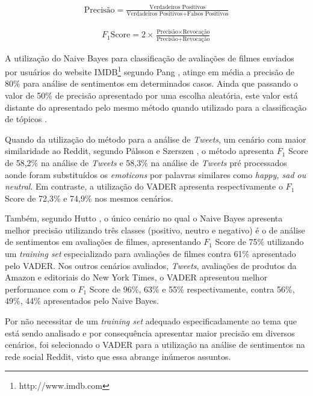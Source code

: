 \begin{equation}
\begin{gathered}
\text{Precisão}
=
\frac{\text{Verdadeiros Positivos}}{\text{Verdadeiros Positivos} +
\text{Falsos Positivos}}
\label{eq:precision}
\end{gathered}
\end{equation}

\begin{equation}
\begin{gathered}
F_1 \text{Score}
= 2 \times
\frac{\text{Precisão} \times \text{Revocação}}{\text{Precisão} +
\text{Revocação}}
\label{eq:f1score}
\end{gathered}
\end{equation}

A utilização do Naive Bayes para classificação de avaliações de filmes enviados
por usuários do website IMDB\footnote{http://www.imdb.com} segundo
Pang \cite{Pang:2002:TUS:1118693.1118704}, atinge em média a precisão de 80\%
para análise de sentimentos em determinados casos. Ainda que passando o valor de
50\% de precisão apresentado por uma escolha aleatória, este valor está distante
do apresentado pelo mesmo método quando utilizado para a classificação de
tópicos \cite{Nigam:2000:TCL:347709.347724}.

Quando da utilização do método para a análise de \textit{Tweets}, um cenário com
maior similaridade ao Reddit, segundo Pålsson e Szerszen
\cite{SentimentinSocialMedia}, o método apresenta $F_1$ Score de 58,2\% na análise
de \textit{Tweets} e 58,3\% na análise de \textit{Tweets} pré processados aonde
foram substituídos os \textit{emoticons} por palavras similares como
\textit{happy, sad ou neutral}. Em contraste, a
utilização do \ac{VADER} apresenta respectivamente o $F_1$
Score de 72,3\% e 74,9\% nos mesmos cenários.

Também, segundo Hutto \cite{conf/icwsm/HuttoG14}, o único cenário no qual o
Naive Bayes apresenta melhor precisão utilizando três classes (positivo,
neutro e negativo) é o de análise de sentimentos em avaliações de filmes,
apresentando $F_1$ Score de 75\% utilizando um \textit{training set}
especializado para avaliações de filmes contra 61\% apresentado pelo \ac{VADER}.
Nos outros cenários avaliados, \textit{Tweets}, avaliações de produtos da
Amazon e editoriais do New York Times, o \ac{VADER} apresentou melhor
performance com o $F_1$ Score de 96\%, 63\% e 55\% respectivamente, contra 56\%,
49\%, 44\% apresentados pelo Naive Bayes.

Por não necessitar de um \textit{training set} adequado
especificadamente ao tema que está sendo analisado e por consequência apresentar
maior precisão em diversos cenários, foi selecionado o \ac{VADER} para a
utilização na análise de sentimentos na rede social Reddit, visto que essa
abrange inúmeros assuntos.

